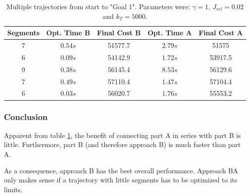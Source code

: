 \begin{table}[H] 
\begin{center}
    \begin{tabular}{| c | c | c |  c | c |}
    \hline
   Segments  & Opt. Time B & Final Cost B & Opt. Time A & Final Cost A \\ \hline
 7& $0.54s$ & 51577.7 & $2.79s$ & 51575 \\ \hline
 6& $0.09s$ & 54142.9 & $1.72s$ & 53917.5 \\ \hline
 9& $0.38s$ &56145.4  & $8.53s$ & 56129.6 \\ \hline
 7& $0.49s$ & 57110.4 & $1.47s$ & 57104.4 \\ \hline
 6& $0.03s$ & 56020.7  & $1.76s$ & 55553.2\\
    \hline
    \end{tabular}
    \caption{Multiple trajectories from start to "Goal 1". Parameters were: $\gamma = 1$, $J_{rel} = 0.02$ and $k_T = 5000$.}
    \label{tab:BA_compare}
\end{center}
\end{table}

\subsubsection{Conclusion}

Apparent from table \ref{tab:BA_compare}, the benefit of connecting part A in series with part B is little. Furthermore, part B (and therefore approach B) is much faster than part A. \newline

As a consequence, approach B has the best overall performance. Approach BA only makes sense if a trajectory with little segments has to be optimized to its  limits.





